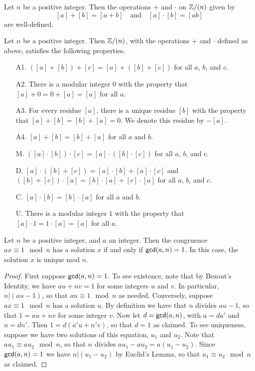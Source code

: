 \begin{cor}
Let \(n\) be a positive integer.
Then the operations \(+\) and \(\cdot\) on \(\mathbb{Z}/(n)\) given by \[ [a] + [b] = [a+b] \quad \mathrm{and} \quad [a] \cdot [b] = [ab] \] are well-defined.
\end{cor}

\begin{prop}
Let \(n\) be a positive integer.
Then \(\mathbb{Z}/(n)\), with the operations \(+\) and \(\cdot\) defined as above, satisfies the following properties.
\begin{itemize}
\item[A1.] \(\left([a] + [b]\right) + [c] = [a] + \left([b] + [c]\right)\) for all \(a\), \(b\), and \(c\).
\item[A2.] There is a modular integer \(0\) with the property that \([a] + 0 = 0 + [a] = [a]\) for all \(a\).
\item[A3.] For every residue \([a]\), there is a unique residue \([b]\) with the property that \([a] + [b] = [b] + [a] = 0\).
We denote this residue by \(-[a]\).
\item[A4.] \([a] + [b] = [b] + [a]\) for all \(a\) and \(b\).
\item[M.] \(\left([a] \cdot [b]\right) \cdot [c] = [a] \cdot \left([b] \cdot [c]\right)\) for all \(a\), \(b\), and \(c\).
\item[D.] \([a] \cdot \left([b] + [c]\right) = [a] \cdot [b] + [a] \cdot [c]\) and \(\left([b] + [c]\right) \cdot [a] = [b] \cdot [a] + [c] \cdot [a]\) for all \(a\), \(b\), and \(c\).
\item[C.] \([a] \cdot [b] = [b] \cdot [a]\) for all \(a\) and \(b\).
\item[U.] There is a modular integer \(1\) with the property that \([a] \cdot 1 = 1 \cdot [a] = [a]\) for all \(a\).
\end{itemize}
\end{prop}



\begin{prop}
Let \(n\) be a positive integer, and \(a\) an integer.
Then the congruence \(ax \equiv 1 \mod n\) has a solution \(x\) if and only if \(\mathsf{gcd}(a, n) = 1\).
In this case, the solution \(x\) is unique mod \(n\).
\end{prop}

\begin{proof}
First suppose \(\mathsf{gcd}(a, n) = 1\).
To see existence, note that by Bezout's Identity, we have \(au + nv = 1\) for some integers \(u\) and \(v\).
In particular, \(n|(au - 1)\), so that \(au \equiv 1 \mod n\) as needed.
Conversely, suppose \(ax \equiv 1 \mod n\) has a solution \(u\).
By definition we have that \(n\) divides \(au - 1\), so that \(1 = au + nv\) for some integer \(v\).
Now let \(d = \mathsf{gcd}(a, n)\), with \(a = da'\) and \(n = dn'\).
Then \(1 = d(a'u + n'v)\), so that \(d = 1\) as claimed.
To see uniqueness, suppose we have two solutions of this equation, \(u_1\) and \(u_2\).
Note that \(au_1 \equiv au_2 \mod n\), so that \(n\) divides \(au_1 - au_2 = a(u_1 - u_2)\).
Since \(\mathsf{gcd}(a, n) = 1\) we have \(n|(u_1 - u_2)\) by Euclid's Lemma, so that \(u_1 \equiv u_2 \mod n\) as claimed.
\end{proof}

